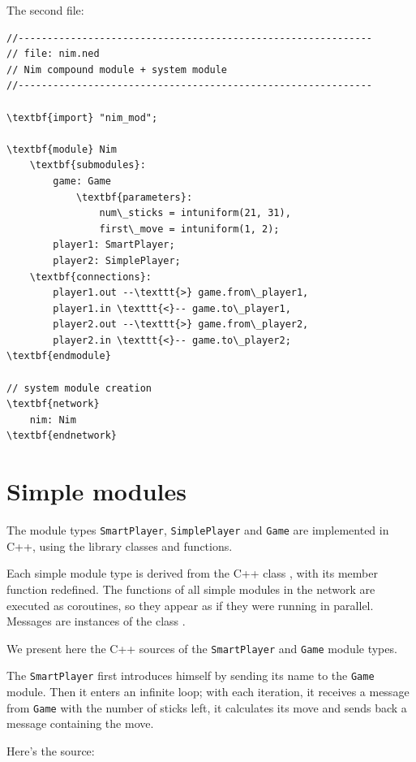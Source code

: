 The second file:

\begin{Verbatim}[commandchars=\\\{\}]
//-------------------------------------------------------------
// file: nim.ned
// Nim compound module + system module
//-------------------------------------------------------------

\textbf{import} "nim_mod";

\textbf{module} Nim
    \textbf{submodules}:
        game: Game
            \textbf{parameters}:
                num\_sticks = intuniform(21, 31),
                first\_move = intuniform(1, 2);
        player1: SmartPlayer;
        player2: SimplePlayer;
    \textbf{connections}:
        player1.out --\texttt{>} game.from\_player1,
        player1.in \texttt{<}-- game.to\_player1,
        player2.out --\texttt{>} game.from\_player2,
        player2.in \texttt{<}-- game.to\_player2;
\textbf{endmodule}

// system module creation
\textbf{network}
    nim: Nim
\textbf{endnetwork}
\end{Verbatim}



\section{Simple modules}

The module types \texttt{SmartPlayer}, \texttt{SimplePlayer} and \texttt{Game} are implemented 
in C++, using the {\opp} library classes and functions.

Each simple module type is derived from the C++
class , with its  member
function redefined. The  functions of all
simple modules in the network are executed as
coroutines, so they appear as if they were running in
parallel.  Messages are instances of the class .

We present here the C++ sources of the \texttt{SmartPlayer} and \texttt{Game} module 
types.

The \texttt{SmartPlayer} first introduces himself by sending its name 
to the \texttt{Game} module. Then it enters an infinite loop; with each 
iteration, it receives a message from \texttt{Game} with the number of 
sticks left, it calculates its move and sends back a message 
containing the move.

Here's the source:

